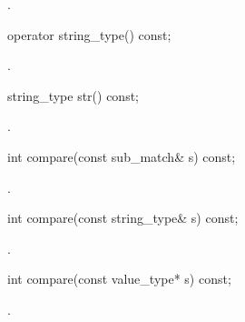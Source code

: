 \begin{itemdescr}
\pnum\returns  {}.
\end{itemdescr}

%
%
\begin{itemdecl}
operator string_type() const;
\end{itemdecl}

\begin{itemdescr}
\pnum\returns {}.
\end{itemdescr}

%
%
\begin{itemdecl}
string_type str() const;
\end{itemdecl}

\begin{itemdescr}
\pnum\returns  {}.
\end{itemdescr}

%
%
\begin{itemdecl}
int compare(const sub_match& s) const;
\end{itemdecl}

\begin{itemdescr}
\pnum\returns  {}.
\end{itemdescr}

%
%
\begin{itemdecl}
int compare(const string_type& s) const;
\end{itemdecl}

\begin{itemdescr}
\pnum\returns  {}.
\end{itemdescr}

%
%
\begin{itemdecl}
int compare(const value_type* s) const;
\end{itemdecl}

\begin{itemdescr}
\pnum\returns  {}.
\end{itemdescr}

